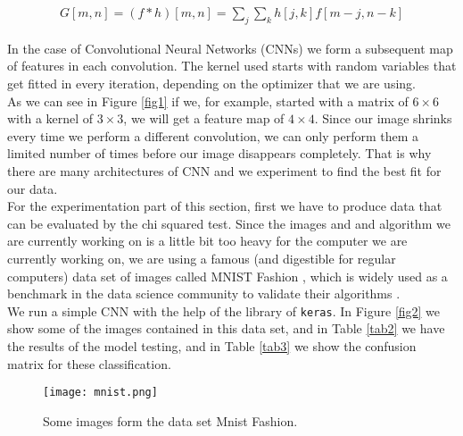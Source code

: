 \documentclass{article}
\begin{document}
 \begin{eqnarray}
\label{eq4}
G[m, n] =  (f*h)[m,n] = \sum_j \sum_k h[j, k]f [m-j, n-k]
\end{eqnarray}

In the case of Convolutional Neural Networks (CNNs) we form a subsequent map of features in each convolution. The kernel used starts with random variables that get fitted in every iteration, depending on the optimizer that we are using. \\

As we can see in Figure \ref{fig1} if we, for example, started with a matrix of $6\times6$ with a kernel of $3\times3$, we will get a feature map of $4\times4$. Since our image shrinks every time we perform a different convolution, we can only perform them a limited number of times before our image disappears completely. That is why there are many architectures of CNN and we experiment to find the best fit for our data.\\

For the experimentation part of this section, first we have to produce data that can be evaluated by the chi squared test. Since the images and and algorithm we are currently working on is a little bit too heavy for the computer we are currently working on, we are using a famous (and digestible for regular computers) data set of images called MNIST Fashion \cite{mnist}, which is widely used as a benchmark in the data science community to validate their algorithms \cite{kaggle}. \\

We run a simple CNN with the help of the library of \texttt{keras}. In Figure \ref{fig2} we show some of the images contained in this data set, and in Table \ref{tab2} we have the results of the model testing, and in Table \ref{tab3} we show the confusion matrix for these classification. \\


\begin{figure}[]
  \centering
  \texttt{[image: mnist.png]}  
	\caption{Some images form the data set Mnist Fashion.}
\label{fig3}
\end{figure}
\end{document}
